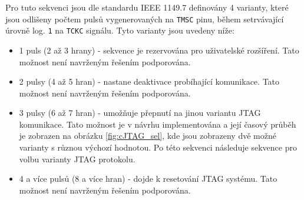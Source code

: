 Pro tuto sekvenci jsou dle standardu IEEE 1149.7 definovány 4 varianty, které jsou odlišeny počtem pulsů vygenerovaných na \texttt{\acs{TMSC}} pinu, během setrvávající úrovně log. \texttt{1} na \texttt{\acs{TCKC}} signálu. Tyto varianty jsou uvedeny níže:

\begin{itemize}
	\item 1 puls (2 až 3 hrany) - sekvence je rezervována pro uživatelské rozšíření. Tato možnost není navrženým řešením podporována.
	\item 2 pulsy (4 až 5 hran) - nastane deaktivace probíhající komunikace. Tato možnost není navrženým řešením podporována.
	\item 3 pulsy (6 až 7 hran) - umožňuje přepnutí na jinou variantu \acs{JTAG} komunikace. Tato možnost je v návrhu implementována a její časový průběh je zobrazen na obrázku \ref{fig:cJTAG_sel}, kde jsou zobrazeny dvě možné varianty s různou výchozí hodnotou. Po této sekvenci následuje sekvence pro volbu varianty \acs{JTAG} protokolu.
	\item 4 a více pulsů (8 a více hran) - dojde k resetování \acs{JTAG} systému. Tato možnost není navrženým řešením podporována.
\end{itemize}



